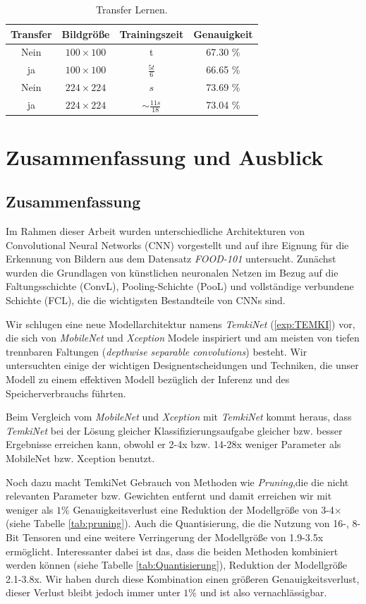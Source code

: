 \documentclass[12pt,a4paper]{scrartcl}
\numberwithin{equation}{section}
\begin{document}
\begin{table}[h!]
	\centering
	\begin{tabular}{*{4}{|c}|}
		\hline
		Transfer & Bildgröße 		& Trainingszeit    		  & Genauigkeit  \\ \hline
		Nein 	 & $ 100\times100 $ & t 			   		  & 67.30 \%  \\ \hline
		ja 		 & $ 100\times100 $ & $ \frac{5t}{6} $ 		  & 66.65 \%  \\ \hline
		Nein	 & $ 224\times224 $ & $ s $ 		   		  & 73.69 \%  \\ \hline
		ja 		 & $ 224\times224 $ & $ \sim \frac{11s}{18} $ & 73.04 \%  \\ \hline
	\end{tabular}
\caption{Transfer Lernen.}
\label{exp:TL}
\end{table}

\section{Zusammenfassung und Ausblick}
\subsection{Zusammenfassung}
Im Rahmen dieser Arbeit wurden unterschiedliche Architekturen von Convolutional
Neural Networks (CNN) vorgestellt und auf ihre Eignung für die Erkennung von Bildern aus dem Datensatz \textit{FOOD-101} untersucht. Zunächst wurden die Grundlagen von
künstlichen neuronalen Netzen im Bezug auf die Faltungsschichte (\ac{ConvL}), Pooling-Schichte (\ac{PooL}) und vollständige verbundene Schichte (\ac{FCL}), die die wichtigsten Bestandteile von \acsp{CNN} sind.

Wir schlugen eine neue Modellarchitektur namens \textit{TemkiNet} (\ref{exp:TEMKI}) vor, die sich von \textit{MobileNet} und \textit{Xception} Modele inspiriert und am meisten von tiefen trennbaren Faltungen (\textit{depthwise separable convolutions}) besteht. Wir untersuchten einige der wichtigen Designentscheidungen und Techniken, die unser Modell zu einem effektiven Modell bezüglich der Inferenz und des Speicherverbrauchs führten.

Beim Vergleich vom \textit{MobileNet} und \textit{Xception} mit \textit{TemkiNet} kommt heraus, dass \textit{TemkiNet} bei der Lösung gleicher Klassifizierungsaufgabe gleicher bzw. besser Ergebnisse erreichen kann, obwohl er 2-4x bzw. 14-28x weniger Parameter als MobileNet bzw. Xception benutzt.

Noch dazu macht TemkiNet Gebrauch von Methoden wie \textit{Pruning},die die nicht relevanten Parameter bzw. Gewichten entfernt und damit erreichen wir  mit weniger als $ 1\% $ Genauigkeitsverlust eine Reduktion der Modellgröße von  3-4$\times $ (siehe Tabelle \ref{tab:pruning}). Auch die Quantisierung, die die Nutzung von 16-, 8-Bit Tensoren und eine weitere Verringerung der Modellgröße von 1.9-3.5x ermöglicht. Interessanter dabei ist das, dass die beiden Methoden kombiniert werden können (siehe Tabelle \ref{tab:Quantisierung}), Reduktion der Modellgröße 2.1-3.8x. Wir haben durch diese Kombination einen größeren Genauigkeitsverlust, dieser Verlust bleibt jedoch immer unter $ 1\% $ und ist also vernachlässigbar.
\end{document}
